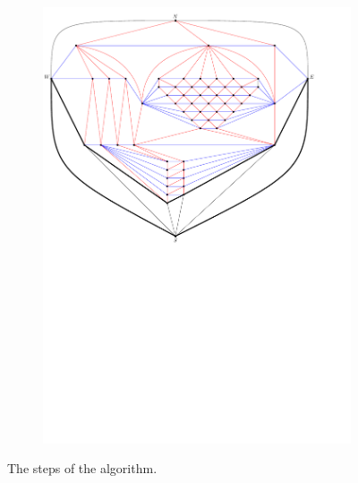 \begin{figure}
\begin{subfigure}[b]{.9 \textwidth}
      \includegraphics[width=\textwidth]{examples/img/vertWorstCase/sweep8}
      \caption{}
      \label{fig:ex:vert:sweep8}
    \end{subfigure}
  \caption{The steps of the algorithm.}
  \label{}

\end{figure}



